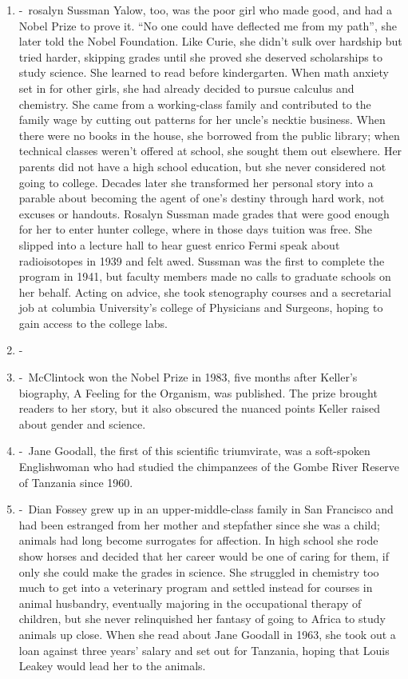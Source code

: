 \documentclass[12pt,a4paper]{article}
\begin{document}
\begin{enumerate}
    \item {} -\ rosalyn Sussman Yalow, too, was the poor girl who made good, and had a Nobel Prize to prove it. ``No one could have deflected me from my path'', she later told the Nobel Foundation. Like Curie, she didn’t sulk over hardship but tried harder, skipping grades until she proved she deserved scholarships to study science. She learned to read before kindergarten. When math anxiety set in for other girls, she had already decided to pursue calculus and chemistry. She came from a working-class family and contributed to the family wage by cutting out patterns for her uncle’s necktie business. When there were no books in the house, she borrowed from the public library; when technical classes weren’t offered at school, she sought them out elsewhere. Her parents did not have a high school education, but she never considered not going to college. Decades later she transformed her personal story into a parable about becoming the agent of one’s destiny through hard work, not excuses or handouts. Rosalyn Sussman made grades that were good enough for her to enter hunter college, where in those days tuition was free. She slipped into a lecture hall to hear guest enrico Fermi speak about radioisotopes in 1939 and felt awed. Sussman was the first to complete the program in 1941, but faculty members made no calls to graduate schools on her behalf. Acting on advice, she took stenography courses and a secretarial job at columbia University’s college of Physicians and Surgeons, hoping to gain access to the college labs. 
    \item {} -\ 
    \item {} -\ McClintock won the Nobel Prize in 1983, five months after Keller’s biography, A Feeling for the Organism, was published. The prize brought readers to her story, but it also obscured the nuanced points Keller raised about gender and science. 
    \item {} -\ Jane Goodall, the first of this scientific triumvirate, was a soft-spoken Englishwoman who had studied the chimpanzees of the Gombe River Reserve of Tanzania since 1960. 
    \item {} -\ Dian Fossey grew up in an upper-middle-class family in San Francisco and had been estranged from her mother and stepfather since she was a child; animals had long become surrogates for affection. In high school she rode show horses and decided that her career would be one of caring for them, if only she could make the grades in science. She struggled in chemistry too much to get into a veterinary program and settled instead for courses in animal husbandry, eventually majoring in the occupational therapy of children, but she never relinquished her fantasy of going to Africa to study animals up close. When she read about Jane Goodall in 1963, she took out a loan against three years’ salary and set out for Tanzania, hoping that Louis Leakey would lead her to the animals. 

\end{enumerate}
\end{document}
